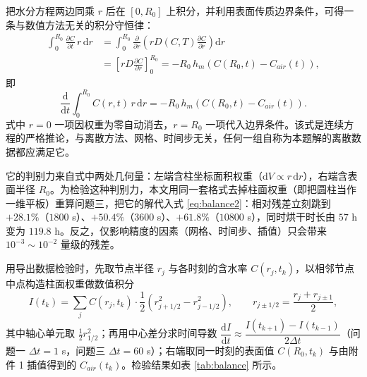 \documentclass[12pt,a4paper]{article}
\begin{document}
\begin{center}
把水分方程两边同乘 $r$ 后在 $[0,R_0]$ 上积分，并利用表面传质边界条件，可得一条与数值方法无关的积分守恒律：
\begin{equation}
\begin{aligned}
\int_0^{R_0}\frac{\partial C}{\partial t}\,r\,\mathrm{d}r
&=\int_0^{R_0}\frac{\partial}{\partial r}\left(rD(C,T)\frac{\partial C}{\partial r}\right)\mathrm{d}r\\
&=\left[rD\frac{\partial C}{\partial r}\right]_{0}^{R_0}
=-R_0\,h_m\left(C(R_0,t)-C_{air}(t)\right),
\end{aligned}
\end{equation}
即
\begin{equation}
\frac{\mathrm{d}}{\mathrm{d}t}\int_0^{R_0}C(r,t)\,r\,\mathrm{d}r=-R_0\,h_m\left(C(R_0,t)-C_{air}(t)\right).
\label{eq:balance2}
\end{equation}
式中 $r=0$ 一项因权重为零自动消去，$r=R_0$ 一项代入边界条件。该式是连续方程的严格推论，与离散方法、网格、时间步无关，任何一组自称为本题解的离散数据都应满足它。

它的判别力来自式中两处几何量：左端含柱坐标面积权重（$\mathrm{d}V\propto r\,\mathrm{d}r$），右端含表面半径 $R_0$。为检验这种判别力，本文用同一套格式去掉柱面权重（即把圆柱当作一维平板）重算问题三，把它的解代入式 \eqref{eq:balance2}：相对残差立刻跳到 $+28.1\%$（$1800$ s）、$+50.4\%$（$3600$ s）、$+61.8\%$（$10800$ s），同时烘干时长由 $57$ h 变为 $119.8$ h。反之，仅影响精度的因素（网格、时间步、插值）只会带来 $10^{-3}\sim10^{-2}$ 量级的残差。

用导出数据检验时，先取节点半径 $r_j$ 与各时刻的含水率 $C(r_j,t_k)$，以相邻节点中点构造柱面权重做数值积分
\begin{equation}
I(t_k)=\sum_{j}C(r_j,t_k)\cdot\frac{1}{2}\left(r_{j+1/2}^{2}-r_{j-1/2}^{2}\right),\qquad r_{j\pm1/2}=\frac{r_j+r_{j\pm1}}{2},
\end{equation}
其中轴心单元取 $\frac{1}{2}r_{1/2}^{2}$；再用中心差分求时间导数 $\dfrac{\mathrm{d}I}{\mathrm{d}t}\approx\dfrac{I(t_{k+1})-I(t_{k-1})}{2\Delta t}$（问题一 $\Delta t=1$ s，问题三 $\Delta t=60$ s）；右端取同一时刻的表面值 $C(R_0,t_k)$ 与由附件 1 插值得到的 $C_{air}(t_k)$。检验结果如表 \ref{tab:balance} 所示。


\end{center}
\end{document}
